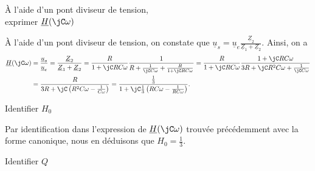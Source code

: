 \begin{enonce}
À l'aide d'un pont diviseur de tension,\\[1mm]
exprimer $\underline{H}(\jC \omega)$
\end{enonce}


\begin{corrige}
    À l'aide d'un pont diviseur de tension, on constate que $
	\underline{u}_s = \underline{u}_e \frac{\underline{Z}_2}{\underline{Z}_1+\underline{Z}_2}
	$. Ainsi, on a
	\begin{align*}
	\underline{H}(\jC \omega) 
	&= \frac{\underline{u}_s}{\underline{u}_e} = \frac{\underline{Z}_2}{\underline{Z}_1+\underline{Z}_2}=
	\frac{R}{1+\jC RC \omega} \frac{ 1 }{ R + \frac{1}{\jC C \omega} + \frac{R}{1 + \jC RC \omega} }
	=\frac{R}{1+\jC RC \omega} \frac{ 1 + \jC RC \omega }{ 3R + \jC R^2C \omega + \frac{1}{\jC C \omega}}\\
	&=	\frac{ R }{ 3R + \jC \left(  R^2C \omega - \frac{1}{C \omega} \right) } 
	=
	\frac{ \frac{1}{3} }{ 1 + \jC \frac{1}{3} \left(  RC \omega - \frac{1}{RC\omega} \right) }.
	\end{align*}
\end{corrige}




\begin{enonce}
	Identifier $H_0$
\end{enonce}


\begin{corrigeNewpage}
    Par identification dans l'expression de $\underline{H}(\jC \omega)$ trouvée précédemment avec la forme canonique, nous en déduisons que $H_0 = \frac{1}{3}$.
\end{corrigeNewpage}



\begin{enonce}
	Identifier $Q$
\end{enonce}

